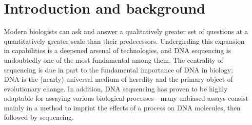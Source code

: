 \documentclass[11pt]{ucthesis}
\begin{document}

\part{Introduction and background}



Modern biologists can ask and answer a qualitatively greater set of questions at a quantitatively greater scale than their predecessors. Undergirding this expansion in capabilities is a deepened arsenal of technologies, and DNA sequencing is undoubtedly one of the most fundamental among them. The centrality of sequencing is due in part to the fundamental importance of DNA in biology; DNA is the (nearly) universal medium of heredity and the primary object of evolutionary change. In addition, DNA sequencing has proven to be highly adaptable for assaying various biological processes---many unbiased assays consist mainly in a method to imprint the effects of a process on DNA molecules, then followed by sequencing. 
 
\end{document}
